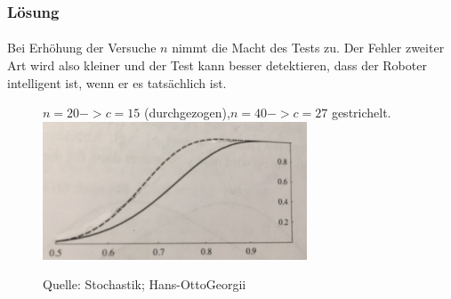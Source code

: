 \documentclass{beamer}
\begin{document}
\begin{frame}
    \frametitle{Lösung}
\framesubtitle{}
Bei Erhöhung der Versuche $n$ nimmt die Macht des Tests zu. Der Fehler zweiter Art wird also kleiner und der Test kann besser detektieren, dass der Roboter intelligent ist, wenn er es tatsächlich ist.
\begin{figure}[htp]
\centering
$n=20  -> c= 15$ (durchgezogen),$ n=40 -> c = 27$ gestrichelt.
      \centering
    \includegraphics[width=0.7\textwidth]{img/bv}

      \caption{Quelle: Stochastik; Hans-OttoGeorgii}
\end{figure}

 \end{frame}
\end{document}
